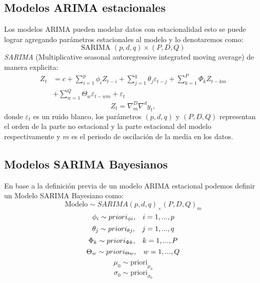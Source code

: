 \documentclass[peerreview]{IEEEtran}
\begin{document}
\subsection{Modelos ARIMA estacionales}
Los modelos ARIMA pueden modelar datos con estacionalidad esto se puede lograr agregando parámetros estacionales al modelo y lo denotaremos como:
$$\text{SARIMA  }(p,d,q)\times(P,D,Q)$$
 \textit{SARIMA} (Multiplicative seasonal autoregressive integrated moving average) de manera explicita:
\begin{align*}
 Z_t  &= c + \sum_{i=1}^p \phi_i Z_{t-i} +\sum_{j=1}^q \theta_j \varepsilon_{t-j}+ \sum_{k=1}^P \Phi_k Z_{t-km}\\ &+\sum_{w=1}^Q \Theta_w \varepsilon_{t-wm}+ \varepsilon_t
\end{align*}
$$Z_t = \nabla_m^D\nabla^d y_t,$$
donde $\varepsilon_t$ es un ruido blanco, los parámetros $(p,d,q)$ y $(P,D,Q)$ representan el orden de la parte no estacional y la parte estacional del modelo respectivamente y $m$ es el periodo de oscilación de la media en los datos.

\subsection{Modelos SARIMA Bayesianos}
En base a la definición previa de un modelo ARIMA estacional podemos definir un Modelo SARIMA Bayesiano como:
$$\text{Modelo} \sim SARIMA(p,d,q)_\times(P,D,Q)_m$$
$$\phi_i \sim priori_{\phi i}, \hspace{0.3cm} i=1,...,p$$
$$\theta_j \sim priori_{\theta j}, \hspace{0.3cm} j=1,...,q$$
$$\Phi_k \sim priori_{\Phi k}, \hspace{0.3cm} k=1,...,P$$
$$\Theta_w \sim priori_{\Theta w}, \hspace{0.3cm} w=1,...,Q$$
$$\mu_0 \sim \text{priori}_{\mu_0}$$
$$\sigma_0 \sim \text{priori}_{\sigma_0}$$
\end{document}
